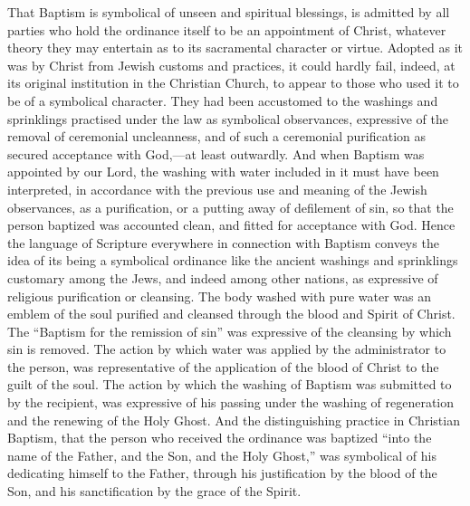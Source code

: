 \documentclass[
  english,
]{book}
\begin{document}
That Baptism is symbolical of unseen and spiritual blessings, is admitted by all parties who hold the ordinance itself to be an appointment of Christ, whatever theory they may entertain as to its sacramental character or virtue. Adopted as it was by Christ from Jewish customs and practices, it could hardly fail, indeed, at its original institution in the Christian Church, to appear to those who used it to be of a symbolical character. They had been accustomed to the washings and sprinklings practised under the law as symbolical observances, expressive of the removal of ceremonial uncleanness, and of such a ceremonial purification as secured acceptance with God,---at least outwardly. And when Baptism was appointed by our Lord, the washing with water included in it must have been interpreted, in accordance with the previous use and meaning of the Jewish observances, as a purification, or a putting away of defilement of sin, so that the person baptized was accounted clean, and fitted for acceptance with God. Hence the language of Scripture everywhere in connection with Baptism conveys the idea of its being a symbolical ordinance like the ancient washings and sprinklings customary among the Jews, and indeed among other nations, as expressive of religious purification or cleansing. The body washed with pure water was an emblem of the soul purified and cleansed through the blood and Spirit of Christ. The ``Baptism for the remission of sin'' was expressive of the cleansing by which sin is removed. The action by which water was applied by the administrator to the person, was representative of the application of the blood of Christ to the guilt of the soul. The action by which the washing of Baptism was submitted to by the recipient, was expressive of his passing under the washing of regeneration and the renewing of the Holy Ghost. And the distinguishing practice in Christian Baptism, that the person who received the ordinance was baptized ``into the name of the Father, and the Son, and the Holy Ghost,'' was symbolical of his dedicating himself to the Father, through his justification by the blood of the Son, and his sanctification by the grace of the Spirit.
\end{document}
